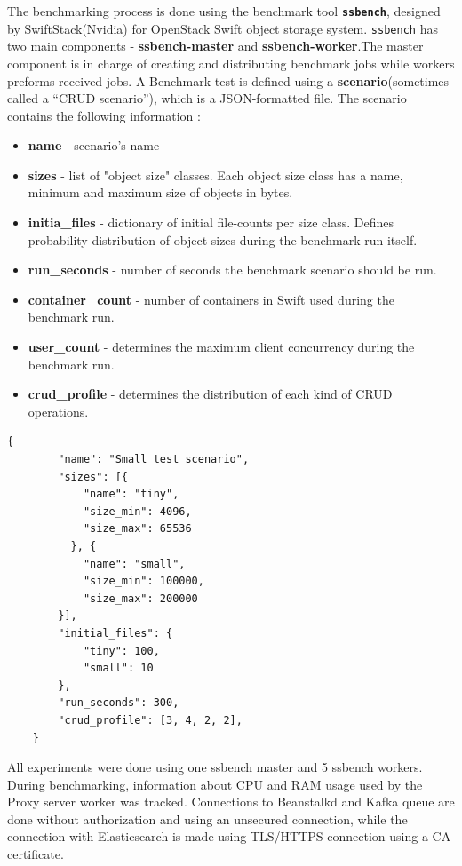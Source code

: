     The benchmarking process is done using the benchmark tool \textbf{\texttt{ssbench}}, designed by SwiftStack(Nvidia) for OpenStack Swift object storage system. \texttt{ssbench} has two main components - \textbf{ssbench-master} and \textbf{ssbench-worker}.The master component is in charge of creating and distributing benchmark jobs while workers preforms received jobs. A Benchmark test is defined using a \textbf{scenario}(sometimes called a “CRUD scenario”), which is a JSON-formatted file. The scenario contains the following information \cite{swiftSsbench123}:
    \begin{itemize}
        \item \textbf{name} - scenario's name
        \item \textbf{sizes} - list of "object size" classes. Each object size class has a name, minimum and maximum size of objects in bytes.
        \item \textbf{initia\_files} - dictionary of initial file-counts per size class. Defines probability distribution of object sizes during the benchmark run itself.
        \item \textbf{run\_seconds} - number of seconds the benchmark scenario should be run.
        \item \textbf{container\_count} - number of containers in Swift used during the benchmark run.
        \item \textbf{user\_count} - determines the maximum client concurrency during the benchmark run.
        \item \textbf{crud\_profile} - determines the distribution of each kind of CRUD operations.
    \end{itemize}

    \begin{lstlisting}[style=jsonStyle, caption=Example of ssbench scenario.]
    {
        "name": "Small test scenario",
        "sizes": [{
            "name": "tiny",
            "size_min": 4096,
            "size_max": 65536
          }, {
            "name": "small",
            "size_min": 100000,
            "size_max": 200000
        }],
        "initial_files": {
            "tiny": 100,
            "small": 10
        },
        "run_seconds": 300,
        "crud_profile": [3, 4, 2, 2],
    }
    \end{lstlisting}

    All experiments were done using one ssbench master and 5 ssbench workers. During benchmarking, information about CPU and RAM usage used by the Proxy server worker was tracked. Connections to Beanstalkd and Kafka queue are done without authorization and using an unsecured connection, while the connection with Elasticsearch is made using TLS/HTTPS connection using a CA certificate.

